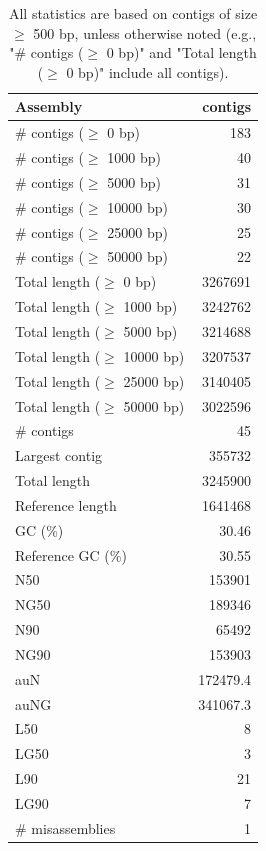\documentclass[12pt,a4paper]{article}
\begin{document}
\begin{table}[ht]
\begin{center}
\caption{All statistics are based on contigs of size $\geq$ 500 bp, unless otherwise noted (e.g., "\# contigs ($\geq$ 0 bp)" and "Total length ($\geq$ 0 bp)" include all contigs).}
\begin{tabular}{|l*{1}{|r}|}
\hline
Assembly & contigs \\ \hline
\# contigs ($\geq$ 0 bp) & 183 \\ \hline
\# contigs ($\geq$ 1000 bp) & 40 \\ \hline
\# contigs ($\geq$ 5000 bp) & 31 \\ \hline
\# contigs ($\geq$ 10000 bp) & 30 \\ \hline
\# contigs ($\geq$ 25000 bp) & 25 \\ \hline
\# contigs ($\geq$ 50000 bp) & 22 \\ \hline
Total length ($\geq$ 0 bp) & 3267691 \\ \hline
Total length ($\geq$ 1000 bp) & 3242762 \\ \hline
Total length ($\geq$ 5000 bp) & 3214688 \\ \hline
Total length ($\geq$ 10000 bp) & 3207537 \\ \hline
Total length ($\geq$ 25000 bp) & 3140405 \\ \hline
Total length ($\geq$ 50000 bp) & 3022596 \\ \hline
\# contigs & 45 \\ \hline
Largest contig & 355732 \\ \hline
Total length & 3245900 \\ \hline
Reference length & 1641468 \\ \hline
GC (\%) & 30.46 \\ \hline
Reference GC (\%) & 30.55 \\ \hline
N50 & 153901 \\ \hline
NG50 & 189346 \\ \hline
N90 & 65492 \\ \hline
NG90 & 153903 \\ \hline
auN & 172479.4 \\ \hline
auNG & 341067.3 \\ \hline
L50 & 8 \\ \hline
LG50 & 3 \\ \hline
L90 & 21 \\ \hline
LG90 & 7 \\ \hline
\# misassemblies & 1 \\ \hline

\end{tabular}
\end{center}
\end{table}
\end{document}
